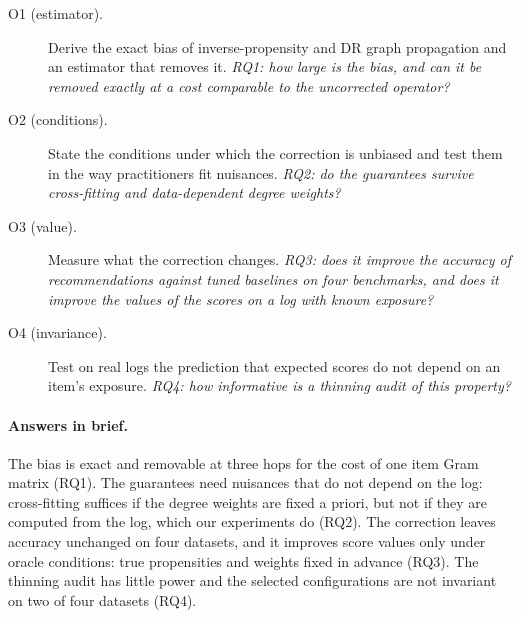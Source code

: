 \begin{description}
\item[O1 (estimator).] Derive the exact bias of inverse-propensity and DR graph
propagation and an estimator that removes it. \emph{RQ1: how large is the bias,
and can it be removed exactly at a cost comparable to the uncorrected operator?}
\item[O2 (conditions).] State the conditions under which the correction is
unbiased and test them in the way practitioners fit nuisances. \emph{RQ2: do the
guarantees survive cross-fitting and data-dependent degree weights?}
\item[O3 (value).] Measure what the correction changes. \emph{RQ3: does it
improve the accuracy of recommendations against tuned baselines on four
benchmarks, and does it improve the values of the scores on a log with known
exposure?}
\item[O4 (invariance).] Test on real logs the prediction that expected scores do
not depend on an item's exposure. \emph{RQ4: how informative is a thinning audit
of this property?}
\end{description}

\paragraph{Answers in brief.} The bias is exact and removable at three hops for
the cost of one item Gram matrix (RQ1). The guarantees need nuisances that do
not depend on the log: cross-fitting suffices if the degree weights are fixed a
priori, but not if they are computed from the log, which our experiments do
(RQ2). The correction leaves accuracy unchanged on four datasets, and it
improves score values only under oracle conditions: true propensities and
weights fixed in advance (RQ3). The thinning audit has little power and the
selected configurations are not invariant on two of four datasets (RQ4).

